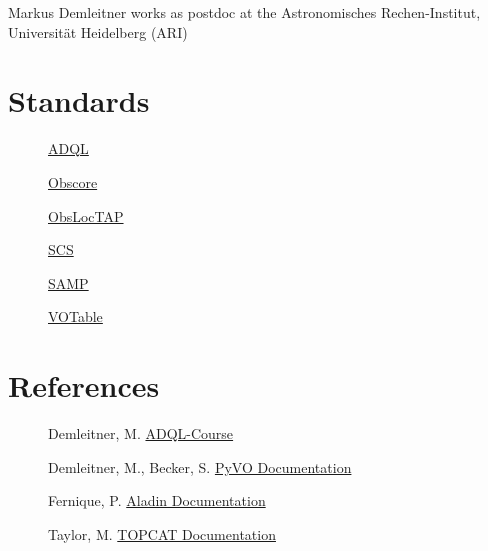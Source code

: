 \documentclass[twoside]{article}[12pt]
\begin{document}
Markus Demleitner works as postdoc at the Astronomisches
Rechen-Institut, Universität Heidelberg (ARI)

\section{Standards}
\begin{description}

\item[]\href{http://www.ivoa.net/documents/REC/ADQL/ADQL-20081030.pdf}{ADQL}

\item[]\href{https://www.ivoa.net/documents/ObsCore/}{Obscore}

\item[]
\href{https://www.ivoa.net/documents/ObsLocTAP/index.html}{ObsLocTAP}

\item[]
\href{https://www.ivoa.net/documents/latest/ConeSearch.html}{SCS}

\item[] \href{https://www.ivoa.net/documents/SAMP/}{SAMP}

\item[]\href{http://www.ivoa.net/documents/VOTable/20130920/REC-VOTable-1.3-20130920.html}{VOTable}


\end{description}

\section{References}

\begin{description}

\item[]Demleitner, M. \href{http://docs.g-vo.org/adql/html/}{ADQL-Course}

\item[]Demleitner, M., Becker, S.
\href{https://pyvo.readthedocs.io/en/latest/}{PyVO Documentation}

\item[]Fernique, P.
\href{http://aladin.u-strasbg.fr/java/AladinManual6.pdf}{Aladin
Documentation}

\item[]Taylor, M.
\href{http://www.star.bris.ac.uk/~mbt/topcat/#docs}{TOPCAT Documentation}

\end{description}
\end{document}
